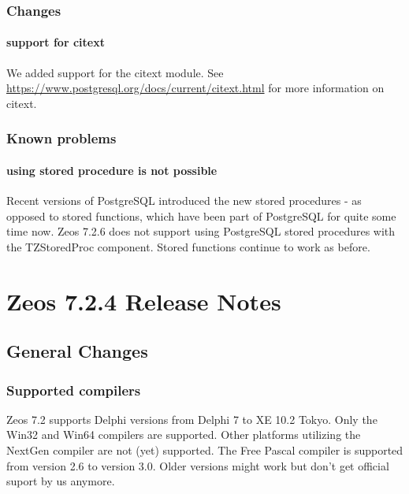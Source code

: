 \documentclass[a4paper,12pt,oneside]{book}
\begin{document}
\subsection{Changes}
\label{sec:Rev6_postgresql_Changes}

\subsubsection{support for citext}
\label{sec:Rev6_postgresql_Changes_citext}

We added support for the citext module.
See \url{https://www.postgresql.org/docs/current/citext.html} for more information on citext.

\subsection{Known problems}
\label{sec:Rev6_postgresql_KnownProblems}

\subsubsection{using stored procedure is not possible}
\label{sec:Rev6_postgresql_KnownProblems_storedprocedures}
Recent versions of PostgreSQL introduced the new stored procedures - as opposed to stored functions, which have been part of PostgreSQL for quite some time now.
Zeos 7.2.6 does not support using PostgreSQL stored procedures with the TZStoredProc component.
Stored functions continue to work as before.

\chapter{Zeos 7.2.4 Release Notes}

\section{General Changes}
\label{sec:Rev4_GeneralChanges}
\subsection{Supported compilers}
\label{sec:Rev4_GeneralChanges_SupportedCompilers}
Zeos 7.2 supports Delphi versions from Delphi 7 to XE 10.2 Tokyo.
Only the Win32 and Win64 compilers are supported.
Other platforms utilizing the NextGen compiler are not (yet) supported.
The Free Pascal compiler is supported from version 2.6 to version 3.0.
Older versions might work but don't get official suport by us anymore.
\end{document}
